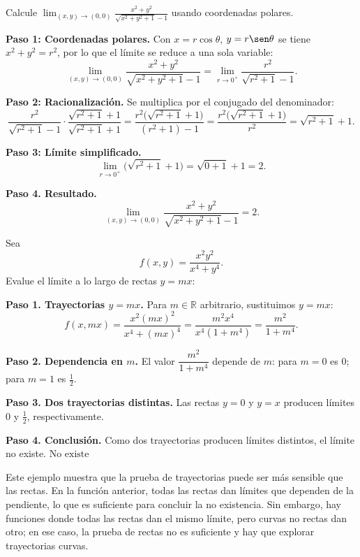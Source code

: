 \begin{prob}
Calcule $\displaystyle\lim_{(x,y)\to(0,0)} \frac{x^2+y^2}{\sqrt{x^2+y^2+1}-1}$
usando coordenadas polares.
\begin{myproof}
\textbf{Paso 1: Coordenadas polares.} Con $x=r\cos\theta$, $y=r\sen\theta$ se tiene $x^2+y^2=r^2$, por lo que el límite se reduce a una sola variable:
\[
  \lim_{(x,y)\to(0,0)}\frac{x^2+y^2}{\sqrt{x^2+y^2+1}-1}
  = \lim_{r\to 0^+}\frac{r^2}{\sqrt{r^2+1}-1}.
\]

\textbf{Paso 2: Racionalización.} Se multiplica por el conjugado del denominador:
\[
  \frac{r^2}{\sqrt{r^2+1}-1}\cdot\frac{\sqrt{r^2+1}+1}{\sqrt{r^2+1}+1}
  = \frac{r^2\bigl(\sqrt{r^2+1}+1\bigr)}{(r^2+1)-1}
  = \frac{r^2\bigl(\sqrt{r^2+1}+1\bigr)}{r^2}
  = \sqrt{r^2+1}+1.
\]

\textbf{Paso 3: Límite simplificado.}
\[
  \lim_{r\to 0^+}\!\bigl(\sqrt{r^2+1}+1\bigr) = \sqrt{0+1}+1 = 2.
\]

\textbf{Paso 4. Resultado.}
\[
  \boxed{\lim_{(x,y)\to(0,0)}\frac{x^2+y^2}{\sqrt{x^2+y^2+1}-1} = 2.}
\]
\end{myproof}
\end{prob}

\begin{example}
Sea
\[
f(x,y) = \frac{x^2 y^2}{x^4 + y^4}.
\]
Evalue el límite a lo largo de rectas $y=mx$:
\begin{myproof}
\textbf{Paso 1. Trayectorias $y=mx$.} Para $m\in\mathbb{R}$ arbitrario,
sustituimos $y=mx$:
\[
f(x,mx) = \frac{x^2(mx)^2}{x^4+(mx)^4}
        = \frac{m^2 x^4}{x^4(1+m^4)}
        = \frac{m^2}{1+m^4}.
\]

\textbf{Paso 2. Dependencia en $m$.} El valor $\dfrac{m^2}{1+m^4}$ depende
de $m$: para $m=0$ es $0$; para $m=1$ es $\tfrac{1}{2}$.

\textbf{Paso 3. Dos trayectorias distintas.} Las rectas $y=0$ y $y=x$
producen límites $0$ y $\tfrac{1}{2}$, respectivamente.

\textbf{Paso 4. Conclusión.} Como dos trayectorias producen límites distintos,
el límite no existe.
$\boxed{\text{No existe}}$
\end{myproof}
\end{example}

\begin{rem}
Este ejemplo muestra que la prueba de trayectorias puede ser más
sensible que las rectas. En la función anterior, todas las rectas dan
límites que dependen de la pendiente, lo que es suficiente para
concluir la no existencia. Sin embargo, hay funciones donde todas las
rectas dan el mismo límite, pero curvas no rectas dan otro; en ese
caso, la prueba de rectas no es suficiente y hay que explorar
trayectorias curvas.
\end{rem}

